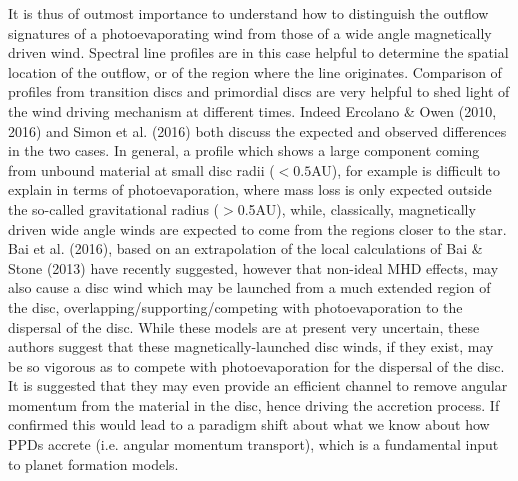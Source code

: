 \documentclass[10pt,fleqn,twoside]{article}
\begin{document}
It is thus of outmost importance to understand how to distinguish the outflow signatures of a photoevaporating wind from those of a wide angle magnetically driven wind. Spectral line profiles are in this case helpful to determine the spatial location of the outflow, or of the region where the line originates. Comparison of profiles from transition discs and primordial discs are very helpful to shed light of the wind driving mechanism at different times. Indeed Ercolano \& Owen (2010, 2016) and Simon et al. (2016) both discuss the expected and observed differences in the two cases. In general, a profile which shows a large component coming from unbound material at small disc radii ($<0.5$AU), for example is difficult to explain in terms of photoevaporation, where mass loss is only expected outside the so-called gravitational radius ($>$0.5AU), while, classically, magnetically driven wide angle winds are expected to come from the regions closer to the star. Bai et al. (2016), based on an extrapolation of the local calculations of Bai \& Stone (2013) have recently suggested, however that non-ideal MHD effects, may also cause a disc wind which may be launched from a much extended region of the disc, overlapping/supporting/competing with photoevaporation to the dispersal of the disc. While these models are at present very uncertain, these authors suggest that these magnetically-launched disc winds, if they exist, may be so vigorous as to compete with photoevaporation for the dispersal of the disc. It is suggested that they may even provide an efficient channel to remove angular momentum from the material in the disc, hence driving the accretion process. If confirmed this would lead to a paradigm shift about what we know about how PPDs accrete (i.e. angular momentum transport), which is a fundamental input to planet formation models. 
\end{document}
